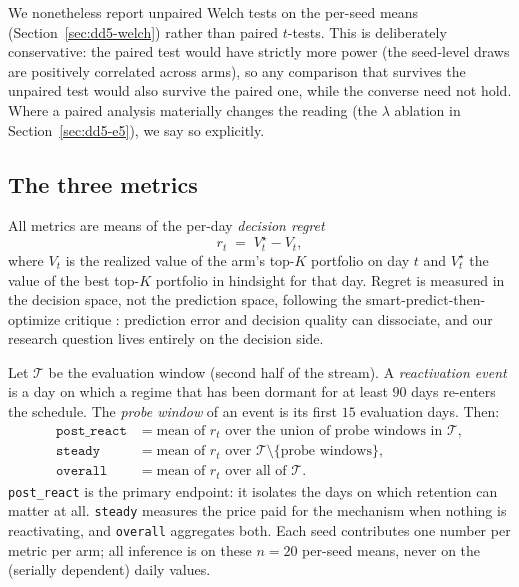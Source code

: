 We nonetheless report unpaired Welch tests on the per-seed means
(Section~\ref{sec:dd5-welch}) rather than paired $t$-tests. This is
deliberately conservative: the paired test would have strictly more power
(the seed-level draws are positively correlated across arms), so any
comparison that survives the unpaired test would also survive the paired one,
while the converse need not hold. Where a paired analysis materially changes
the reading (the $\lambda$ ablation in Section~\ref{sec:dd5-e5}), we say so
explicitly.

\subsection{The three metrics}
\label{sec:dd5-metrics}

All metrics are means of the per-day \emph{decision regret}
\[
r_t \;=\; V^{\star}_t - V_t,
\]
where $V_t$ is the realized value of the arm's top-$K$ portfolio on day $t$
and $V^{\star}_t$ the value of the best top-$K$ portfolio in hindsight for
that day. Regret is measured in the decision space, not the prediction space,
following the smart-predict-then-optimize critique
\citep{elmachtoub2022smart}: prediction error and decision quality can
dissociate, and our research question lives entirely on the decision side.

Let $\mathcal{T}$ be the evaluation window (second half of the stream). A
\emph{reactivation event} is a day on which a regime that has been dormant
for at least $90$ days re-enters the schedule. The \emph{probe window} of an
event is its first $15$ evaluation days. Then:
\begin{align}
\texttt{post\_react} &= \text{mean of } r_t \text{ over the union of probe
windows in } \mathcal{T}, \label{eq:dd5-postreact}\\
\texttt{steady} &= \text{mean of } r_t \text{ over }
\mathcal{T} \setminus \{\text{probe windows}\}, \label{eq:dd5-steady}\\
\texttt{overall} &= \text{mean of } r_t \text{ over all of } \mathcal{T}.
\label{eq:dd5-overall}
\end{align}
\texttt{post\_react} is the primary endpoint: it isolates the days on which
retention can matter at all. \texttt{steady} measures the price paid for the
mechanism when nothing is reactivating, and \texttt{overall} aggregates both.
Each seed contributes one number per metric per arm; all inference is on
these $n=20$ per-seed means, never on the (serially dependent) daily values.

